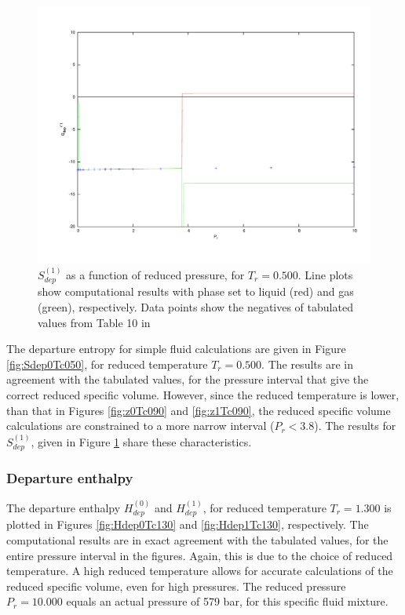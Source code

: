 \documentclass[english]{../thermomemo/thermomemo}
\numberwithin{equation}{section}
\begin{document}
\begin{figure}
	\centering
	\includegraphics[trim = 1.5cm 2cm 0 1cm, clip = true, width=14cm]{Sdep1Tc050}
	\caption{$S_{dep}^{(1)}$ as a function of reduced pressure, for $T_r = 0.500$. Line plots show computational results with phase set to liquid (red) and gas (green), respectively. Data points show the negatives of tabulated values from Table 10 in \cite{LK}}
	\label{fig:Sdep1Tc050}
\end{figure}

The departure entropy for simple fluid calculations are given in Figure \ref{fig:Sdep0Tc050}, for reduced temperature $T_r = 0.500$. The results are in agreement with the tabulated values, for the pressure interval that give the correct reduced specific volume. However, since the reduced temperature is lower, than that in Figures \ref{fig:z0Tc090} and \ref{fig:z1Tc090}, the reduced specific volume calculations are constrained to a more narrow interval ($P_r < 3.8$). The results for $S_{dep} ^{(1)}$, given in Figure \ref{fig:Sdep1Tc050} share these characteristics.

\subsubsection*{Departure enthalpy}
The departure enthalpy $H_{dep}^{(0)}$ and  $H_{dep}^{(1)}$, for reduced temperature $T_r = 1.300$ is plotted in Figures \ref{fig:Hdep0Tc130} and \ref{fig:Hdep1Tc130}, respectively. The computational results are in exact agreement with the tabulated values, for the entire pressure interval in the figures. Again, this is due to the choice of reduced temperature. A high reduced temperature allows for accurate calculations of the reduced specific volume, even for high pressures. The reduced pressure $P_r = 10.000$ equals an actual pressure of 579 bar, for this specific fluid mixture.
\end{document}
